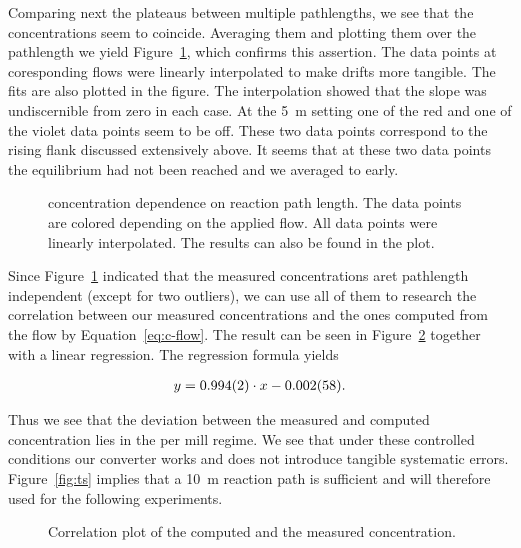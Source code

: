 Comparing next the  plateaus between multiple pathlengths, we
see that the concentrations seem to coincide. Averaging them and
plotting them over the pathlength we yield Figure~\ref{fig:no-length},
which confirms this assertion. The data points at coresponding flows
were linearly interpolated to make drifts more tangible. The fits are
also plotted in the figure. The interpolation showed that the slope
was undiscernible from zero in each case. At the \SI{5}{\meter}
setting one of the red and one of the violet data points seem to be
off. These two data points correspond to the rising flank discussed
extensively above. It seems that at these two data points the
equilibrium had not been reached and we averaged to early.

\begin{figure}[htbp]
  \centering
  
  \caption{ concentration dependence on reaction path
    length. The data points are colored depending on the applied
     flow. All data points were linearly interpolated. The
    results can also be found in the plot.}
  \label{fig:no-length}
\end{figure}

Since Figure~\ref{fig:no-length} indicated that the measured
concentrations aret pathlength independent (except for two outliers),
we can use all of them to research the correlation between our
measured concentrations and the ones computed from the flow by
Equation~\eqref{eq:c-flow}. The result can be seen in
Figure~\ref{fig:no-calib} together with a linear regression. The
regression formula yields

\begin{align*}
  y = \num{0.994 \pm 0.002}  \cdot x -\num{0.002 \pm 0.058}.
\end{align*}

Thus we see that the deviation between the measured and computed
concentration lies in the per mill regime. We see that under these
controlled conditions our converter works and does not introduce
tangible systematic errors. Figure~\ref{fig:ts} implies that a
\SI{10}{\meter} reaction path is sufficient and will therefore used
for the following experiments.

\begin{figure}[htbp]
  \centering
  
  \caption{Correlation plot of the computed and the measured 
    concentration.}
  \label{fig:no-calib}
\end{figure}

